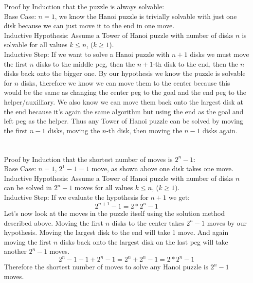 \documentclass[12pt]{article}
\begin{document}
\noindent
Proof by Induction that the puzzle is always solvable:\\

Base Case: $n = 1$, we know the Hanoi puzzle is trivially solvable with just one disk because we can just move it to the end in one move.\\

Inductive Hypothesis: Assume a Tower of Hanoi puzzle with number of disks $n$ is solvable for all values $k \leq n$, ($k \geq 1$). \\

Inductive Step: If we want to solve a Hanoi puzzle with $n+1$ disks we must move the first $n$ disks to the middle peg, then the $n+1$-th disk to the end, then the $n$ disks back onto the bigger one. By our hypothesis we know the puzzle is solvable for $n$ disks, therefore we know we can move them to the center because this would be the same as changing the center peg to the goal and the end peg to the helper/auxilliary. We also know we can move them back onto the largest disk at the end because it's again the same algorithm but using the end as the goal and left peg as the helper. Thus any Tower of Hanoi puzzle can be solved by moving the first $n-1$ disks, moving the $n$-th disk, then moving the $n-1$ disks again.\\\\\\

\noindent
Proof by Induction that the shortest number of moves is $2^n-1$:\\

Base Case: $n = 1$, $2^1-1=1$ move, as shown above one disk takes one move.\\

Inductive Hypothesis: Assume a Tower of Hanoi puzzle with number of disks $n$ can be solved in $2^n-1$ moves for all values $k \leq n$, ($k \geq 1$). \\

Inductive Step: If we evaluate the hypothesis for $n+1$ we get:
\[ 2^{n+1}-1 = 2*2^n-1\]
Let's now look at the moves in the puzzle itself using the solution method described above. Moving the first $n$ disks to the center takes $2^n-1$ moves by our hypothesis. Moving the largest disk to the end will take 1 move. And again moving the first $n$ disks back onto the largest disk on the last peg will take another $2^n-1$ moves.
\[ 2^n-1 + 1 + 2^n-1 = 2^n + 2^n - 1 = 2*2^n - 1 \]
Therefore the shortest number of moves to solve any Hanoi puzzle is $2^n-1$ moves.
\end{document}
